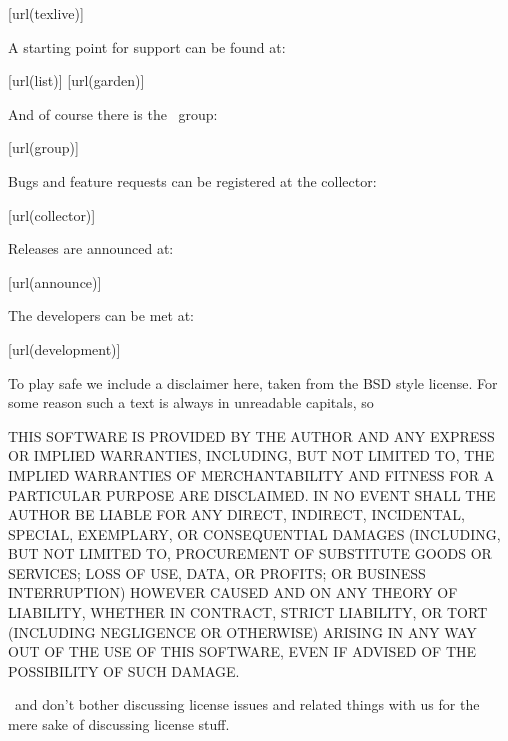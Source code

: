 \startlines
\goto{\url[texlive]}[url(texlive)]
\stoplines

A starting point for support can be found at:

\startlines
\goto{\url[list]}[url(list)]
\goto{\url[garden]}[url(garden)]
\stoplines

And of course there is the \CONTEXT\ group:

\startlines
\goto{\url[group]}[url(group)]
\stoplines

Bugs and feature requests can be registered at the collector:

\startlines
\goto{\url[collector]}[url(collector)]
\stoplines

Releases are announced at:

\startlines
\goto{\url[announce]}[url(announce)]
\stoplines

The developers can be met at:

\startlines
\goto{\url[development]}[url(development)]
\stoplines

\stopsubject

\startsubject[title={Disclaimer}]

To play safe we include a disclaimer here, taken from the BSD style license. For
some reason such a text is always in unreadable capitals, so \unknown

\start \txx \blue
THIS SOFTWARE IS PROVIDED BY THE AUTHOR  AND ANY EXPRESS OR
IMPLIED WARRANTIES, INCLUDING, BUT NOT LIMITED TO, THE IMPLIED WARRANTIES
OF MERCHANTABILITY AND FITNESS FOR A PARTICULAR PURPOSE ARE DISCLAIMED.
IN NO EVENT SHALL THE AUTHOR BE LIABLE FOR ANY DIRECT, INDIRECT,
INCIDENTAL, SPECIAL, EXEMPLARY, OR CONSEQUENTIAL DAMAGES (INCLUDING, BUT
NOT LIMITED TO, PROCUREMENT OF SUBSTITUTE GOODS OR SERVICES; LOSS OF USE,
DATA, OR PROFITS; OR BUSINESS INTERRUPTION) HOWEVER CAUSED AND ON ANY
THEORY OF LIABILITY, WHETHER IN CONTRACT, STRICT LIABILITY, OR TORT
(INCLUDING NEGLIGENCE OR OTHERWISE) ARISING IN ANY WAY OUT OF THE USE OF
THIS SOFTWARE, EVEN IF ADVISED OF THE POSSIBILITY OF SUCH DAMAGE.
\stop

\unknown\ and don't bother discussing license issues and related things with us
for the mere sake of discussing license stuff.

\stopsubject

\stopdocument
